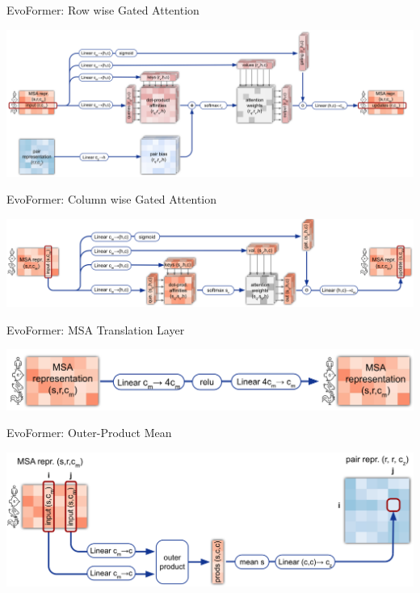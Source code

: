 \documentclass[presentation, smaller]{beamer}
\begin{document}
\begin{frame}[label={sec:orgb477dba}]{EvoFormer: Row wise Gated Attention \cite{jumperHighlyAccurateProtein2021}}
\begin{center}
\includegraphics[width=.9\linewidth]{./imgs/rowwise-gated-attention.png}
\end{center}
\end{frame}

\begin{frame}[label={sec:org1602926}]{EvoFormer: Column wise Gated Attention \cite{jumperHighlyAccurateProtein2021}}
\begin{center}
\includegraphics[width=.9\linewidth]{./imgs/columnwise-gated-attention.png}
\end{center}
\end{frame}

\begin{frame}[label={sec:org93dc13e}]{EvoFormer: MSA Translation Layer \cite{jumperHighlyAccurateProtein2021}}
\begin{center}
\includegraphics[width=.9\linewidth]{./imgs/msa-translation-layer.png}
\end{center}
\end{frame}

\begin{frame}[label={sec:org2d98481}]{EvoFormer: Outer-Product Mean \cite{jumperHighlyAccurateProtein2021}}
\begin{center}
\includegraphics[width=.9\linewidth]{./imgs/outer-product-mean.png}
\end{center}
\end{frame}
\end{document}
